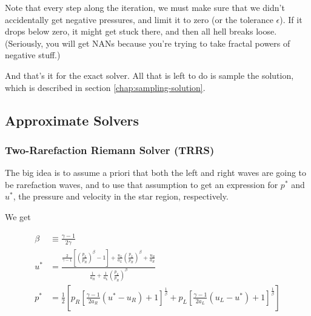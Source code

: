 Note that every step along the iteration, we must make sure that we didn't accidentally get negative pressures, and limit it to zero (or the tolerance $\epsilon$). 
If it drops below zero, it might get stuck there, and then all hell breaks loose.
(Seriously, you will get NANs because you're trying to take fractal powers of negative stuff.)


And that's it for the exact solver.
All that is left to do is sample the solution, which is described in section \ref{chap:sampling-solution}.






\subsection{Approximate Solvers}



\subsubsection{Two-Rarefaction Riemann Solver (TRRS)}





The big idea is to assume a priori that both the left and right waves are going to be rarefaction waves, and to use that assumption to get an expression for $p^*$ and $u^*$, the pressure and velocity in the star region, respectively.

We get

\begin{align}
	\beta &\equiv 
		\frac{\gamma - 1}{2 \gamma} \\
	u^* &= 
		\frac{
			\frac{2}{\gamma - 1} \left[\left(\frac{p_L}{p_R} \right) ^ \beta - 1\right]+ \frac{u_L}{a_L} \left(\frac{p_L}{p_R} \right) ^ \beta  + \frac{u_R}{a_R}
		}{
			\frac{1}{a_R} + \frac{1}{a_L}\left(\frac{p_L}{p_R} \right) ^ \beta
		} \\
	p^* &=
		\frac{1}{2} \left[
			p_R \left[ \frac{\gamma - 1}{2 a_R} (u^* - u_R) + 1 \right] ^ \frac{1}{\beta} +
			p_L \left[ \frac{\gamma - 1}{2 a_L} (u_L - u^*) + 1 \right] ^ \frac{1}{\beta}
		\right] \label{eq:pstar-trrs}
\end{align}

